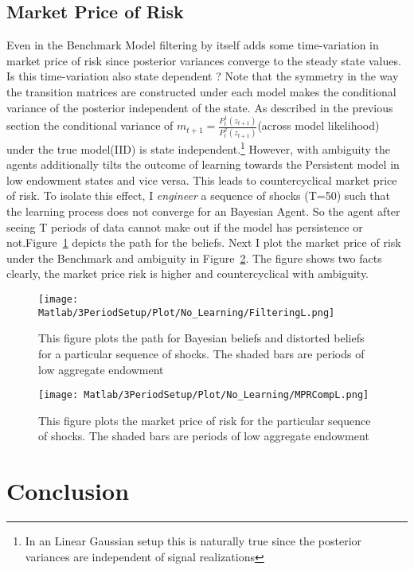 \documentclass[12pt]{article}
\begin{document}
\subsection{Market Price of Risk}
Even in the Benchmark Model filtering by itself adds some time-variation in market price of risk since posterior variances converge to the steady state values. Is this time-variation also state dependent ? Note that the symmetry in the way the transition matrices are constructed under each model makes the conditional variance of the posterior independent of the state. As described in the previous section the conditional variance of $m_{t+1}=\frac{P^{1}_t(z_{t+1})}{P^{2}_t(z_{t+1})}$(across model likelihood) under the true model(IID) is state independent.\footnote{In an Linear Gaussian setup this is naturally true since the posterior variances are independent of signal realizations} However, with ambiguity the agents additionally tilts the outcome of learning towards the Persistent model in low endowment states and vice versa. This leads to countercyclical market price of risk. To isolate this effect, I \emph{engineer} a sequence of shocks (T=50) such that the learning process does not converge for an Bayesian Agent. So the agent after seeing T periods of data cannot make out if the model has persistence or not.Figure~\ref{fig:FilteringL} depicts the path for the beliefs. Next I plot the market price of risk under the Benchmark and ambiguity in Figure~\ref{fig:MPRCompL}. The figure shows two facts clearly, the market price risk is higher and countercyclical with ambiguity.
\begin{figure}[htbp]
\centering
	  \texttt{[image: Matlab/3PeriodSetup/Plot/No\_Learning/FilteringL.png]}

	\caption{This figure plots the path for Bayesian beliefs and distorted beliefs for a particular sequence of shocks. The shaded bars are periods of low aggregate endowment}
	\label{fig:FilteringL}
\end{figure} 

\begin{figure}[htbp]
\centering
	  \texttt{[image: Matlab/3PeriodSetup/Plot/No\_Learning/MPRCompL.png]}

	\caption{This figure plots the market price of risk for the particular sequence of shocks. The shaded bars are periods of low aggregate endowment}
	\label{fig:MPRCompL}
\end{figure} 

\section{Conclusion}
\appendix
\end{document}
